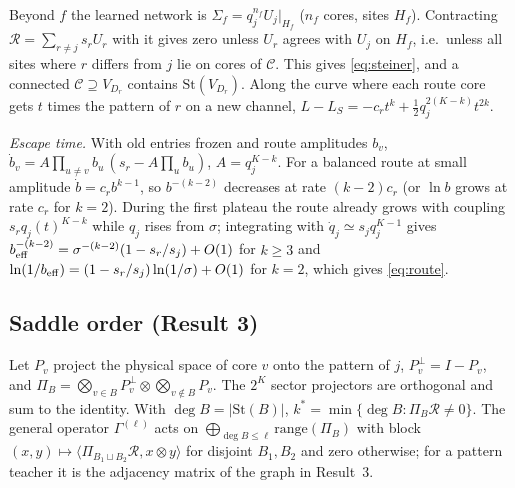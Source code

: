 \documentclass[11pt]{article}
\newcommand{\St}{\mathrm{St}}
\begin{document}
Beyond $f$ the learned network is $\Sigma_f=q_j^{n_f}U_j|_{H_f}$ ($n_f$ cores, sites $H_f$). Contracting
$\mathcal R=\sum_{r\ne j}s_rU_r$ with it gives zero unless $U_r$ agrees with $U_j$ on $H_f$, i.e.\ unless all sites
where $r$ differs from $j$ lie on cores of $\mathcal C$. This gives \eqref{eq:steiner}, and a connected
$\mathcal C\supseteq V_{D_r}$ contains $\St(V_{D_r})$. Along the curve where each route core gets $t$ times the
pattern of $r$ on a new channel, $L-L_S=-c_rt^k+\tfrac12q_j^{2(K-k)}t^{2k}$.

\emph{Escape time.} With old entries frozen and route amplitudes $b_v$,
$\dot b_v=A\prod_{u\ne v}b_u\,(s_r-A\prod_ub_u)$, $A=q_j^{K-k}$. For a balanced route at small amplitude
$\dot b=c_rb^{k-1}$, so $b^{-(k-2)}$ decreases at rate $(k-2)c_r$ (or $\ln b$ grows at rate $c_r$ for $k=2$).
During the first plateau the route already grows with coupling $s_rq_j(t)^{K-k}$ while $q_j$ rises from
$\sigma$; integrating with $\dot q_j\simeq s_jq_j^{K-1}$ gives
$b_{\rm eff}^{-(k-2)}=\sigma^{-(k-2)}(1-s_r/s_j)+O(1)$ for $k\ge3$ and
$\ln(1/b_{\rm eff})=(1-s_r/s_j)\ln(1/\sigma)+O(1)$ for $k=2$, which gives \eqref{eq:route}.

\subsection{Saddle order (Result 3)}\label{app:order}
Let $P_v$ project the physical space of core $v$ onto the pattern of $j$, $P_v^\perp=I-P_v$, and
$\Pi_B=\bigotimes_{v\in B}P_v^\perp\otimes\bigotimes_{v\notin B}P_v$. The $2^K$ sector projectors are orthogonal and
sum to the identity. With $\deg B=\lvert\St(B)\rvert$, $k^*=\min\{\deg B:\Pi_B\mathcal R\ne0\}$. The general
operator $\Gamma^{(\ell)}$ acts on $\bigoplus_{\deg B\le\ell}\mathrm{range}(\Pi_B)$ with block
$(x,y)\mapsto\langle\Pi_{B_1\sqcup B_2}\mathcal R,x\otimes y\rangle$ for disjoint $B_1,B_2$ and zero otherwise; for a pattern
teacher it is the adjacency matrix of the graph in Result~3.
\end{document}
